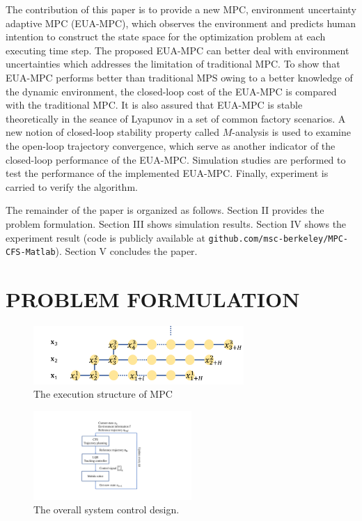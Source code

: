 \documentclass[letterpaper, 10 pt, conference]{ieeeconf}  %
\begin{document}
The contribution of this paper is to provide a new MPC, environment uncertainty adaptive MPC (EUA-MPC), which observes the environment and predicts human intention to construct the state space for the optimization problem at each executing time step. The proposed EUA-MPC can better deal with environment uncertainties which addresses the limitation of traditional MPC. To show that EUA-MPC performs better than traditional MPS owing to a better knowledge of the dynamic environment, the closed-loop cost of the EUA-MPC is compared with the traditional MPC. It is also assured that EUA-MPC is stable theoretically in the seance of Lyapunov in a set of common factory scenarios. A new notion of closed-loop stability property called $M$-analysis  \cite{jess2018mstable} is used to examine the open-loop trajectory convergence, which serve as another indicator of the closed-loop performance of the EUA-MPC. Simulation studies are performed to test the performance of the implemented EUA-MPC. Finally, experiment is carried to verify the algorithm.

The remainder of the paper is organized as follows. Section II provides the problem formulation. Section III shows simulation results. Section IV shows the experiment result (code is publicly available at {\tt\small github.com/msc-berkeley/MPC-CFS-Matlab}). Section V concludes the paper.

\section{PROBLEM FORMULATION}

\begin{figure}[t]
\begin{center}
\includegraphics[width=8cm]{src/MPCstruc.png}
\caption{The execution structure of MPC}
\label{fig: mpc}
\end{center}
\end{figure}

\begin{figure}[t]
      \centering
      \includegraphics[width=6cm]{plot/MPCsystem.pdf}
      \caption{The overall system control design. }
      \label{fig:MPCsystem}
\end{figure}
\end{document}

